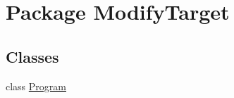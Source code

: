 \hypertarget{namespace_modify_target}{\section{Package Modify\-Target}
\label{namespace_modify_target}
}
\subsection*{Classes}
\begin{DoxyCompactItemize}
\item 
class \hyperlink{class_modify_target_1_1_program}{Program}
\end{DoxyCompactItemize}
